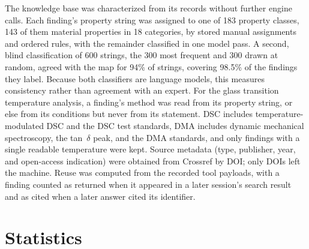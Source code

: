 \documentclass[journal=mamobx,manuscript=suppinfo]{achemso}
\begin{document}
The knowledge base was characterized from its records without further engine calls.
Each finding's property string was assigned to one of 183 property classes, 143 of them material properties in 18 categories, by stored manual assignments and ordered rules, with the remainder classified in one model pass.
A second, blind classification of 600 strings, the 300 most frequent and 300 drawn at random, agreed with the map for 94\% of strings, covering 98.5\% of the findings they label.
Because both classifiers are language models, this measures consistency rather than agreement with an expert.
For the glass transition temperature analysis, a finding's method was read from its property string, or else from its conditions but never from its statement.
DSC includes temperature-modulated DSC and the DSC test standards, DMA includes dynamic mechanical spectroscopy, the tan~$\delta$ peak, and the DMA standards, and only findings with a single readable temperature were kept.
Source metadata (type, publisher, year, and open-access indication) were obtained from Crossref by DOI; only DOIs left the machine.
Reuse was computed from the recorded tool payloads, with a finding counted as returned when it appeared in a later session's search result and as cited when a later answer cited its identifier.

\section{Statistics}
\label{si:stats}
\end{document}
